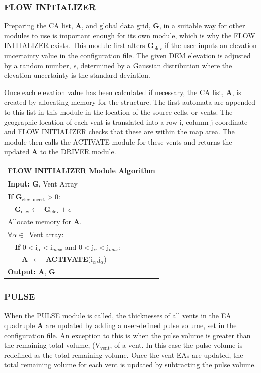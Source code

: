 \documentclass[12pt,letter]{article}
\begin{document}
		\subsubsection{FLOW INITIALIZER}
			Preparing the CA list, \textbf{A}, and global data grid, \textbf{G}, in a suitable way for other modules to use is important enough for its own module, which is why the FLOW INITIALIZER exists. This module first alters \textbf{G}$_\mathrm{elev}$ if the user inputs an elevation uncertainty value in the configuration file.  The given DEM elevation is adjusted by a random number, $\epsilon$, determined by a Gaussian distribution where the elevation uncertainty is the standard deviation.
			
			Once each elevation value has been calculated if necessary, the CA list, \textbf{A}, is created by allocating memory for the structure. The first automata are appended to this list in this module in the location of the source cells, or vents. The geographic location of each vent is translated into a row i, column j coordinate and FLOW INITIALIZER checks that these are within the map area. The module then calls the ACTIVATE module for these vents and returns the updated \textbf{A} to the DRIVER module.
			
			\begin{center}
				\begin{tabular}{l}
					\toprule
					\textbf{FLOW INITIALIZER Module Algorithm}\\
					\midrule
					\textbf{Input: G}, Vent Array\\
					\textbf{If} \textbf{G}$_{\mathrm{elev~uncert}}>0$:\\
					~~\textbf{G}$_{\mathrm{elev}}\leftarrow$~\textbf{G}$_{\mathrm{elev}}+\epsilon$\\
					Allocate memory for \textbf{A}.\\
					
					$\forall \alpha \in$~Vent array:\\
					~~\textbf{If} $0<$i$_{\alpha}<$i$_{max}$ and $0<$j$_{\alpha}<$j$_{max}$:\\
					~~~~\textbf{A}~$\leftarrow$~\textbf{ACTIVATE}(i$_\alpha$,j$_\alpha$)\\
					
					\textbf{Output: A}, \textbf{G}\\
					\bottomrule
				\end{tabular}
			\end{center}
		
		\subsubsection{PULSE}
			When the PULSE module is called, the thicknesses of all vents in the EA quadruple \textbf{A} are updated by adding a user-defined pulse volume, set in the configuration file. An exception to this is when the pulse volume is greater than the remaining total volume, (V$_{\mathrm{vent}}$, of a vent. In this case the pulse volume is redefined as the total remaining volume. Once the vent EAs are updated, the total remaining volume for each vent is updated by subtracting the pulse volume.
			
\end{document}
